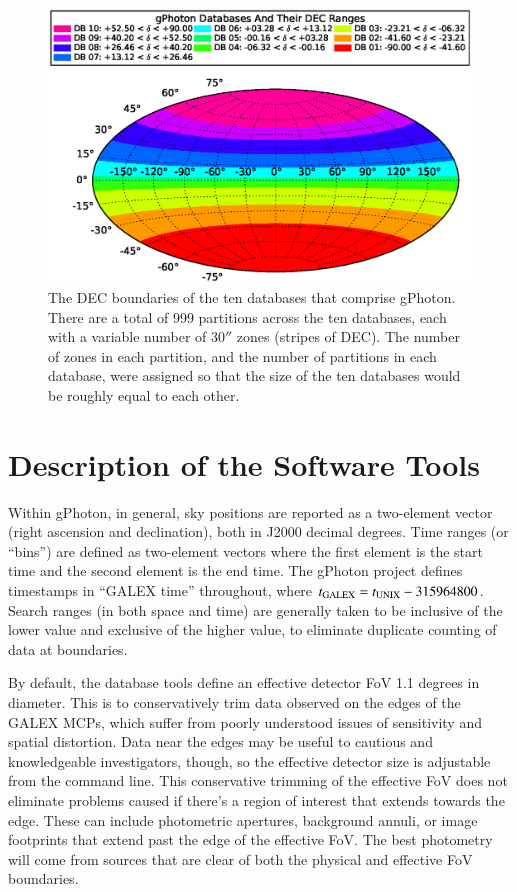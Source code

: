 \documentclass[5p]{elsarticle}
\begin{document}
\begin{figure}
\includegraphics[scale=0.48]{FigDBDist.eps}
\caption{The DEC boundaries of the ten databases that comprise gPhoton.  There are a total of 999 partitions across the ten databases, each with a variable number of $30''$ zones (stripes of DEC).  The number of zones in each partition, and the number of partitions in each database, were assigned so that the size of the ten databases would be roughly equal to each other. \label{dbdist}}
\end{figure}

\section{Description of the Software Tools}
\label{softwaretools}
Within gPhoton, in general, sky positions are reported as a two-element vector (right ascension and declination), both in J2000 decimal degrees. Time ranges (or ``bins'') are defined as two-element vectors where the first element is the start time and the second element is the end time. The gPhoton project defines timestamps in ``GALEX time'' throughout, where $t_{\rm{GALEX}} = t_{\rm{UNIX}} - 315964800$. Search ranges (in both space and time) are generally taken to be inclusive of the lower value and exclusive of the higher value, to eliminate duplicate counting of data at boundaries.

By default, the database tools define an effective detector FoV 1.1 degrees in diameter. This is to conservatively trim data observed on the edges of the GALEX MCPs, which suffer from poorly understood issues of sensitivity and spatial distortion. Data near the edges may be useful to cautious and knowledgeable investigators, though, so the effective detector size is adjustable from the command line. This conservative trimming of the effective FoV does not eliminate problems caused if there's a region of interest that extends towards the edge.  These can include photometric apertures, background annuli, or image footprints that extend past the edge of the effective FoV.  The best photometry will come from sources that are clear of both the physical and effective FoV boundaries.
\end{document}
